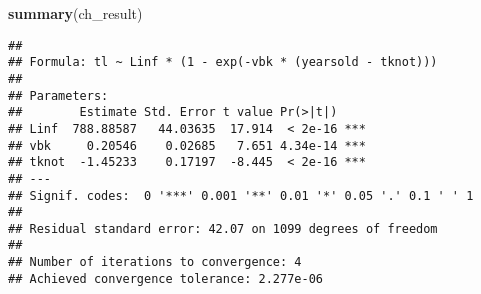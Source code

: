 \documentclass[
]{article}
\newenvironment{Shaded}{\begin{snugshade}}{\end{snugshade}}
\newcommand{\ControlFlowTok}[1]{\textcolor[rgb]{0.13,0.29,0.53}{\textbf{#1}}}
\newcommand{\DataTypeTok}[1]{\textcolor[rgb]{0.13,0.29,0.53}{#1}}
\newcommand{\DecValTok}[1]{\textcolor[rgb]{0.00,0.00,0.81}{#1}}
\newcommand{\FloatTok}[1]{\textcolor[rgb]{0.00,0.00,0.81}{#1}}
\newcommand{\KeywordTok}[1]{\textcolor[rgb]{0.13,0.29,0.53}{\textbf{#1}}}
\newcommand{\NormalTok}[1]{#1}
\newcommand{\OperatorTok}[1]{\textcolor[rgb]{0.81,0.36,0.00}{\textbf{#1}}}
\newcommand{\StringTok}[1]{\textcolor[rgb]{0.31,0.60,0.02}{#1}}
\begin{document}
\begin{Shaded}
\end{Shaded}

\begin{Shaded}
\begin{Highlighting}[]
\KeywordTok{summary}\NormalTok{(ch\_result)}
\end{Highlighting}
\end{Shaded}

\begin{verbatim}
## 
## Formula: tl ~ Linf * (1 - exp(-vbk * (yearsold - tknot)))
## 
## Parameters:
##        Estimate Std. Error t value Pr(>|t|)    
## Linf  788.88587   44.03635  17.914  < 2e-16 ***
## vbk     0.20546    0.02685   7.651 4.34e-14 ***
## tknot  -1.45233    0.17197  -8.445  < 2e-16 ***
## ---
## Signif. codes:  0 '***' 0.001 '**' 0.01 '*' 0.05 '.' 0.1 ' ' 1
## 
## Residual standard error: 42.07 on 1099 degrees of freedom
## 
## Number of iterations to convergence: 4 
## Achieved convergence tolerance: 2.277e-06
\end{verbatim}
\end{document}
